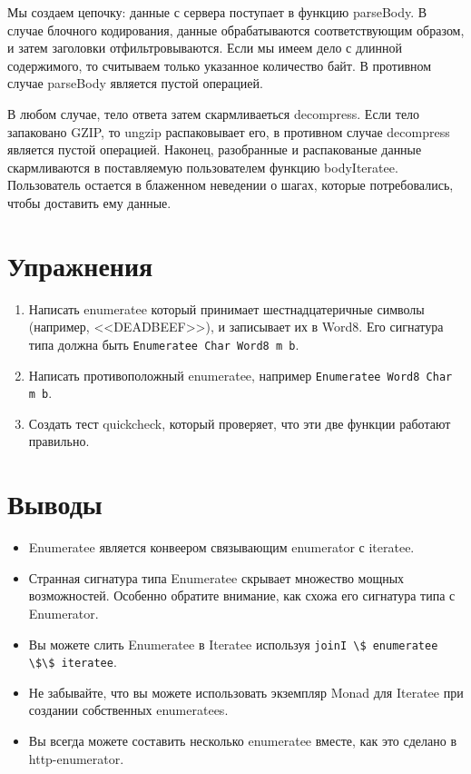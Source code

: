 Мы создаем цепочку: данные с сервера поступает в функцию parseBody. В случае блочного кодирования, данные обрабатываются соответствующим образом, и затем заголовки отфильтровываются. Если мы имеем дело с длинной содержимого, то считываем только указанное количество байт. В противном случае parseBody является пустой операцией.

В любом случае, тело ответа затем скармливаеться decompress. Если тело запаковано GZIP, то ungzip распаковывает его, в противном случае decompress является пустой операцией. Наконец, разобранные и распакованые данные скармливаются в поставляемую пользователем функцию bodyIteratee. Пользователь остается в блаженном неведении о шагах, которые потребовались, чтобы доставить ему данные.

\section{Упражнения}

\begin{enumerate}
\item Написать enumeratee который принимает шестнадцатеричные символы (например, <<DEADBEEF>>), и записывает их в Word8. Его сигнатура типа должна быть \lstinline'Enumeratee Char Word8 m b'.
\item Написать противоположный enumeratee, например \lstinline'Enumeratee Word8 Char m b'.
\item Создать тест quickcheck, который проверяет, что эти две функции работают правильно.
\end{enumerate}

\section{Выводы}

\begin{itemize}
\item Enumeratee является конвеером связывающим enumerator с iteratee.
\item Странная сигнатура типа Enumeratee скрывает множество мощных возможностей. Особенно обратите внимание, как схожа его сигнатура типа с Enumerator.
\item Вы можете слить Enumeratee в Iteratee используя \lstinline'joinI \$ enumeratee \$\$ iteratee'.
\item Не забывайте, что вы можете использовать экземпляр Monad для Iteratee при создании собственных enumeratees.
\item Вы всегда можете составить несколько enumeratee вместе, как это сделано в http-enumerator.
\end{itemize}
